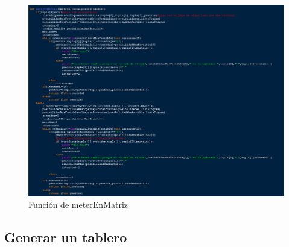 \documentclass[journal]{IEEEtran}
\begin{document}
\begin{figure}[h] 
	\centering \includegraphics[width=1\columnwidth]{backtrack_parte2.png}
	\caption{
		\label{fig:samplesetup}
		Función de meterEnMatriz
	}
\end{figure}
\subsection{Generar un tablero}
\end{document}
